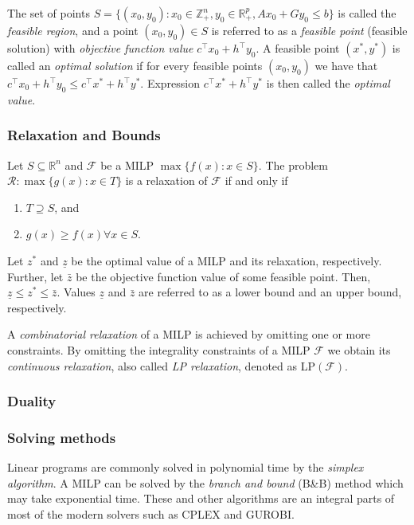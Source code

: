 The set of points $S=\{(x_0,y_0):  x_0 \in \mathbb{Z}^{n}_+, y_0  \in\mathbb{R}^{p}_+, Ax_0 + Gy_0 \leq b\}$ is called the \emph{feasible region},  
and a point $(x_0,y_0)\in S$ is referred to as a \emph{feasible point} (feasible solution) with \emph{objective function value} $c^\top x_0 + h^\top y_0$. 
A feasible point $(x^*,y^*)$ is called an \emph{optimal solution} if for every feasible points $(x_0,y_0)$ we have that $c^\top x_0 + h^\top y_0 \leq c^\top x^* + h^\top y^*$. 
Expression $c^\top x^* + h^\top y^*$ is then called the \emph{optimal value}. 

\subsubsection{Relaxation and Bounds}

\begin{definition}
	Let $S\subseteq \mathbb{R}^n$ and $\mathcal{F}$ be a MILP $\max\{f(x):x\in S\}$.
	The problem $\mathcal{R}: \max\{g(x):x\in T\}$ is a relaxation of $\mathcal{F}$ if and only if
	\begin{enumerate}
		\item $T\supseteq S$, and
		\item $g(x)\geq f(x) \forall x\in S$.
	\end{enumerate}
\end{definition}


Let $z^*$ and $\underline{z}$ be the optimal value of a MILP and its relaxation, respectively. 
Further, let $\bar{z}$ be the objective function value of some feasible point.
Then, $\underline{z}\leq z^* \leq \bar{z}$.
Values $\underline{z}$ and $\bar{z}$ are referred to as a lower bound and an upper bound, respectively.

A \emph{combinatorial relaxation} of a MILP is achieved by omitting one or more constraints. 
By omitting the integrality constraints of a MILP $\mathcal{F}$ we obtain its \emph{continuous relaxation}, also called \emph{LP relaxation}, denoted as LP$(\mathcal{F})$.

\subsubsection{Duality}

\subsubsection{Solving methods}

Linear programs are commonly solved in polynomial time by the \emph{simplex algorithm}.
A MILP can be solved by the \emph{branch and bound} (B\&B) method which may take exponential time.
These and other algorithms are an integral parts of most of the modern solvers such as CPLEX and GUROBI.

